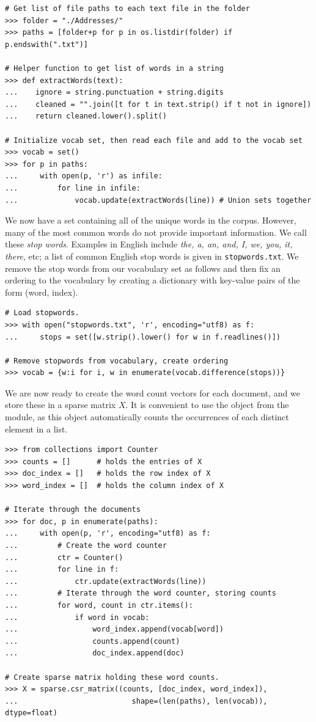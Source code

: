 \begin{lstlisting}
# Get list of file paths to each text file in the folder
>>> folder = "./Addresses/"
>>> paths = [folder+p for p in os.listdir(folder) if p.endswith(".txt")]

# Helper function to get list of words in a string
>>> def extractWords(text):
...    ignore = string.punctuation + string.digits
...    cleaned = "".join([t for t in text.strip() if t not in ignore])
...    return cleaned.lower().split()

# Initialize vocab set, then read each file and add to the vocab set
>>> vocab = set()
>>> for p in paths:
...     with open(p, 'r') as infile:
...         for line in infile:
...             vocab.update(extractWords(line)) # Union sets together
\end{lstlisting}

We now have a set containing all of the unique words in the corpus.
However, many of the most common words do not provide important information.
We call these \emph{stop words}. Examples in English include \emph{the, a, an, and, I, we, you, it, there}, etc; a list of common English stop words is given in \texttt{stopwords.txt}.
We remove the stop words from our vocabulary set as follows and then fix an ordering to the vocabulary by creating a dictionary
with key-value pairs of the form (word, index).

\begin{lstlisting}
# Load stopwords.
>>> with open("stopwords.txt", 'r', encoding="utf8) as f:
...     stops = set([w.strip().lower() for w in f.readlines()])

# Remove stopwords from vocabulary, create ordering
>>> vocab = {w:i for i, w in enumerate(vocab.difference(stops))}
\end{lstlisting}

We are now ready to create the word count vectors for each document, and we store these in a sparse matrix $X$.
It is convenient to use the  object from the  module, as this object automatically counts the occurrences of each distinct element in a list.

\begin{lstlisting}
>>> from collections import Counter
>>> counts = []      # holds the entries of X
>>> doc_index = []   # holds the row index of X
>>> word_index = []  # holds the column index of X

# Iterate through the documents
>>> for doc, p in enumerate(paths):
...     with open(p, 'r', encoding="utf8) as f:
...         # Create the word counter
...         ctr = Counter()
...         for line in f:
...             ctr.update(extractWords(line))
...         # Iterate through the word counter, storing counts
...         for word, count in ctr.items():
...             if word in vocab:
...                 word_index.append(vocab[word])
...                 counts.append(count)
...                 doc_index.append(doc)

# Create sparse matrix holding these word counts.
>>> X = sparse.csr_matrix((counts, [doc_index, word_index]),
...                          shape=(len(paths), len(vocab)), dtype=float)
\end{lstlisting}

